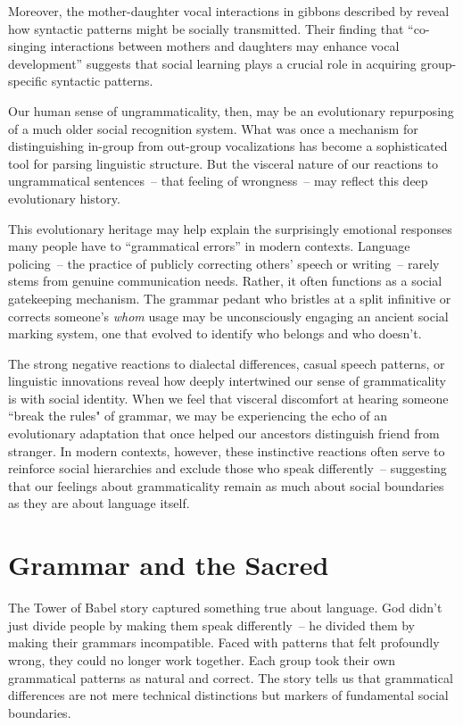 Moreover, the mother-daughter vocal interactions in gibbons described by \citet{Koda2013} reveal how syntactic patterns might be socially transmitted. Their finding that ``co-singing interactions between mothers and daughters may enhance vocal development'' suggests that social learning plays a crucial role in acquiring group-specific syntactic patterns.

Our human sense of ungrammaticality, then, may be an evolutionary repurposing of a much older social recognition system. What was once a mechanism for distinguishing in-group from out-group vocalizations has become a sophisticated tool for parsing linguistic structure. But the visceral nature of our reactions to ungrammatical sentences~-- that feeling of wrongness~-- may reflect this deep evolutionary history.

This evolutionary heritage may help explain the surprisingly emotional responses many people have to ``grammatical errors'' in modern contexts. Language policing~-- the practice of publicly correcting others' speech or writing~-- rarely stems from genuine communication needs. Rather, it often functions as a social gatekeeping mechanism. The grammar pedant who bristles at a split infinitive or corrects someone's \textit{whom} usage may be unconsciously engaging an ancient social marking system, one that evolved to identify who belongs and who doesn't.

The strong negative reactions to dialectal differences, casual speech patterns, or linguistic innovations reveal how deeply intertwined our sense of grammaticality is with social identity. When we feel that visceral discomfort at hearing someone ``break the rules" of grammar, we may be experiencing the echo of an evolutionary adaptation that once helped our ancestors distinguish friend from stranger. In modern contexts, however, these instinctive reactions often serve to reinforce social hierarchies and exclude those who speak differently~-- suggesting that our feelings about grammaticality remain as much about social boundaries as they are about language itself.

\section{Grammar and the Sacred}

The Tower of Babel story captured something true about language. God didn't just divide people by making them speak differently~-- he divided them by making their grammars incompatible. Faced with patterns that felt profoundly wrong, they could no longer work together. Each group took their own grammatical patterns as natural and correct. The story tells us that grammatical differences are not mere technical distinctions but markers of fundamental social boundaries.

